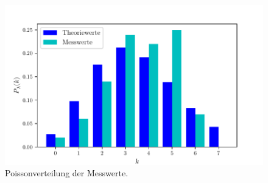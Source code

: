 \begin{figure}[H]
  \centering
  \includegraphics[width=\textwidth]{build/poisson.pdf}
  \caption {Poissonverteilung der Messwerte.}
  \label{fig:poisson}
\end{figure}


